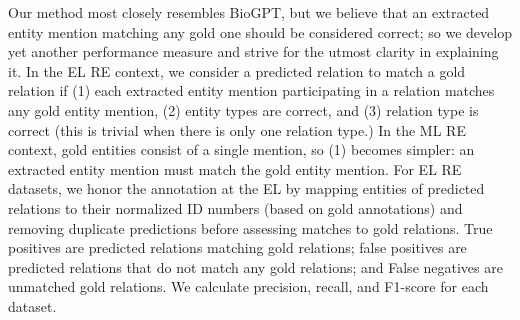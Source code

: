 \documentclass[11pt]{article}
\begin{document}
\begin{table}[htbp]
\centering
\small
\renewcommand{\arraystretch}{1.3}
\caption{\label{table:datasets} Basic properties of the biomedical datasets tested, including whether relations were annotated at the mention-level or entity-level, whether the input text is a sentence or an abstract, the number of entity types and predicates, and whether the dataset contains instances with no relations.}
\end{table}

Our method most closely resembles BioGPT, but we believe that an extracted entity mention matching any gold one should be considered correct; so we develop yet another performance measure and strive for the utmost clarity in explaining it.  In the EL RE context, we consider a predicted relation to match a gold relation if (1) each extracted entity mention participating in a relation matches any gold entity mention, (2) entity types are correct, and (3) relation type is correct (this is trivial when there is only one relation type.)  In the ML RE context, gold entities consist of a single mention, so (1) becomes simpler: an extracted entity mention must match the gold entity mention.  For EL RE datasets, we honor the annotation at the EL by mapping entities of predicted relations to their normalized ID numbers (based on gold annotations) and removing duplicate predictions before assessing matches to gold relations.  True positives are predicted relations matching gold relations; false positives are predicted relations that do not match any gold relations; and False negatives are unmatched gold relations. We calculate precision, recall, and F1-score for each dataset. 
\end{document}
